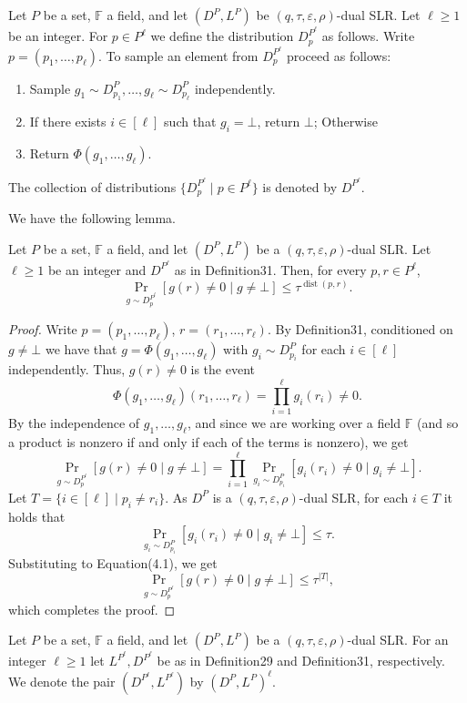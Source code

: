 \begin{ntdefinition}
Let $P$ be a set, $\mathbb F$ a field, and let $(D^P,L^P)$ be $(q,\tau,\varepsilon,\rho)$-dual SLR. Let $\ell\geq1$ be an integer. For $p\in P^\ell$ we define the distribution $D_p^{P^\ell}$ as follows. Write $p=(p_1,\ldots,p_\ell)$. To sample an element from $D_p^{P^\ell}$ proceed as follows:
\begin{enumerate}
\item Sample $g_1\sim D_{p_1}^P,\ldots,g_\ell\sim D_{p_\ell}^P$ independently.
\item If there exists $i\in[\ell]$ such that $g_i=\bot$, return $\bot$; Otherwise
\item Return $\Phi(g_1,\ldots,g_\ell)$.
\end{enumerate}
The collection of distributions $\{D_p^{P^\ell}\mid p\in P^\ell\}$ is denoted by $D^{P^\ell}$.
\end{ntdefinition}
We have the following lemma.
\begin{ntlemma}
Let $P$ be a set, $\mathbb F$ a field, and let $(D^P,L^P)$ be a $(q,\tau,\varepsilon,\rho)$-dual SLR. Let $\ell\geq1$ be an integer and $D^{P^\ell}$ as in Definition31. Then, for every $p,r\in P^\ell$,
\[\Pr_{g\sim D_p^{P^\ell}}[g(r)\ne0\mid g\ne\bot]\leq\tau^{\operatorname{dist}(p,r)}.\]
\end{ntlemma}
\begin{proof}
Write $p=(p_1,\ldots,p_\ell)$, $r=(r_1,\ldots,r_\ell)$. By Definition31, conditioned on $g\ne\bot$ we have that $g=\Phi(g_1,\ldots,g_\ell)$ with $g_i\sim D_{p_i}^P$ for each $i\in[\ell]$ independently. Thus, $g(r)\ne0$ is the event
\[\Phi(g_1,\ldots,g_\ell)(r_1,\ldots,r_\ell)=\prod_{i=1}^\ell g_i(r_i)\ne0.\]
By the independence of $g_1,\ldots,g_\ell$, and since we are working over a field $\mathbb F$ (and so a product is nonzero if and only if each of the terms is nonzero), we get
\begin{equation}\Pr_{g\sim D_p^{P^\ell}}[g(r)\ne0\mid g\ne\bot]=\prod_{i=1}^\ell\Pr_{g_i\sim D_{p_i}^P}[g_i(r_i)\ne0\mid g_i\ne\bot].\tag{4.1}\end{equation}
Let $T=\{i\in[\ell]\mid p_i\ne r_i\}$. As $D^P$ is a $(q,\tau,\varepsilon,\rho)$-dual SLR, for each $i\in T$ it holds that
\[\Pr_{g_i\sim D_{p_i}^P}[g_i(r_i)\ne0\mid g_i\ne\bot]\leq\tau.\]
Substituting to Equation(4.1), we get
\[\Pr_{g\sim D_p^{P^\ell}}[g(r)\ne0\mid g\ne\bot]\leq\tau^{|T|},\]
which completes the proof.
\end{proof}
\begin{ntdefinition}
Let $P$ be a set, $\mathbb F$ a field, and let $(D^P,L^P)$ be a $(q,\tau,\varepsilon,\rho)$-dual SLR. For an integer $\ell\geq1$ let $L^{P^\ell},D^{P^\ell}$ be as in Definition29 and Definition31, respectively. We denote the pair $(D^{P^\ell},L^{P^\ell})$ by $(D^P,L^P)^\ell$.
\end{ntdefinition}

